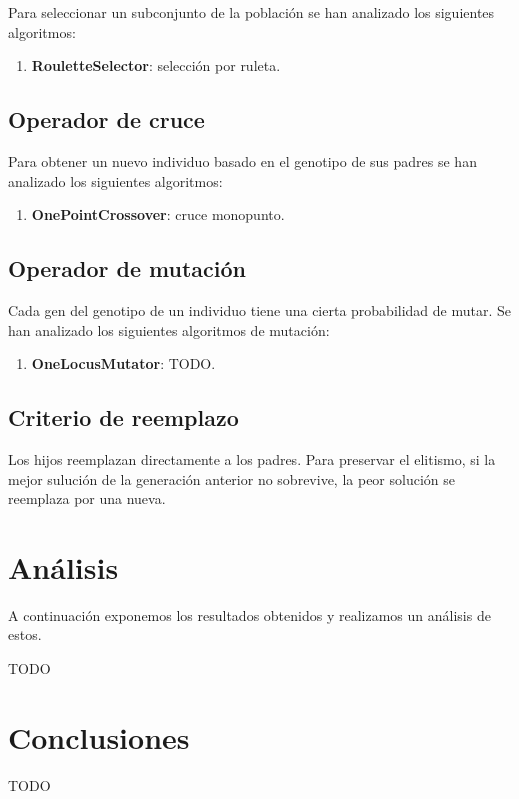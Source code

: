 \documentclass[a4paper,12pt,titlepage]{article}
\begin{document}
Para seleccionar un subconjunto de la población se han analizado los siguientes algoritmos:

\begin{enumerate}[noitemsep]
	\item \textbf{RouletteSelector}: selección por ruleta.
\end{enumerate}

\subsection{Operador de cruce}

Para obtener un nuevo individuo basado en el genotipo de sus padres se han analizado los siguientes algoritmos:

\begin{enumerate}[noitemsep]
	\item \textbf{OnePointCrossover}: cruce monopunto.
\end{enumerate}

\subsection{Operador de mutación}

Cada gen del genotipo de un individuo tiene una cierta probabilidad de mutar. Se han analizado los siguientes algoritmos de mutación:

\begin{enumerate}[noitemsep]
	\item \textbf{OneLocusMutator}: TODO.
\end{enumerate}

\subsection{Criterio de reemplazo}

Los hijos reemplazan directamente a los padres. Para preservar el elitismo, si la mejor sulución de la generación anterior no sobrevive, la peor solución se reemplaza por una nueva.

\section{Análisis}

A continuación exponemos los resultados obtenidos y realizamos un análisis de estos.

TODO

\section{Conclusiones}

TODO

\newpage


\end{document}
